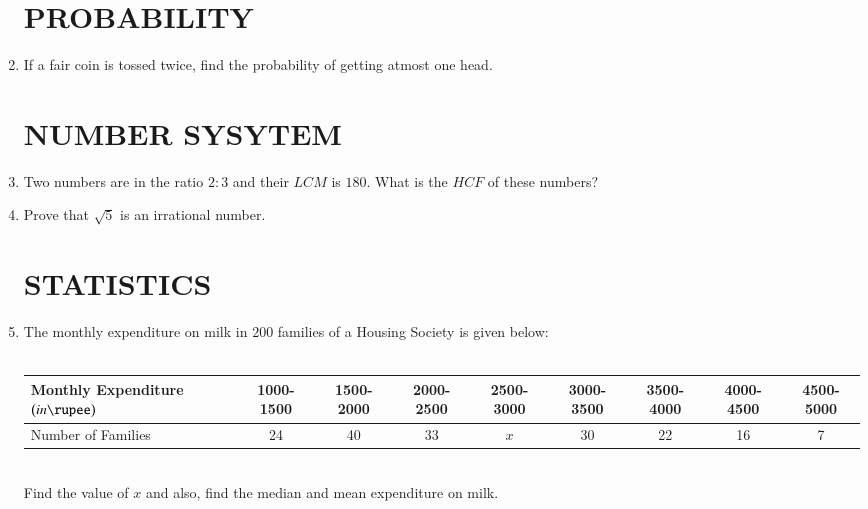 \documentclass[12pt,-letter paper]{article}
\providecommand{\brak}[1]{\ensuremath{\left(#1\right)}}
\begin{document}
\begin{enumerate}
\section*{PROBABILITY}
\item
If a fair coin is tossed twice, find the probability of getting atmost one head.
\section*{NUMBER SYSYTEM}
\item
Two numbers are in the ratio $2:3$ and their $LCM$ is $180$. What is the $HCF$ of these numbers?
\item
Prove that $\sqrt{5}$ is an irrational number.
\section*{STATISTICS}
\item
The monthly expenditure on milk in $200$ families of a Housing Society is given below:\\
\\
\footnotesize
\setlength{\tabcolsep}{1pt}
\begin{tabular}{|l|c|c|c|c|c|c|c|c|}
\hline
	Monthly Expenditure \brak{in \rupee} & 1000-1500 & 1500-2000 & 2000-2500 & 2500-3000 & 3000-3500 & 3500-4000 & 4000-4500 & 4500-5000 \\ \hline
Number of Families & 24 & 40 & 33 & $x$ & 30 & 22 & 16 & 7 \\ \hline
\end{tabular}\\

Find the value of $x$ and also, find the median and mean expenditure on milk.



\end{enumerate}
\end{document}
